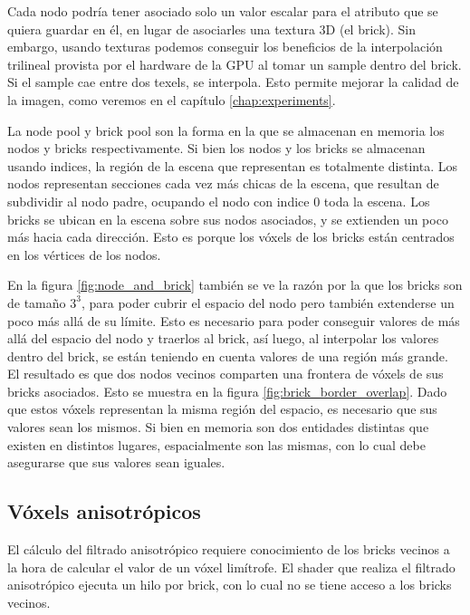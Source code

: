 Cada nodo podría tener asociado solo un valor escalar para el atributo que se quiera guardar en él, en lugar de asociarles una textura 3D (el brick).
Sin embargo, usando texturas podemos conseguir los beneficios de la interpolación trilineal provista por el hardware de la GPU al tomar un sample dentro del brick.
Si el sample cae entre dos texels, se interpola.
Esto permite mejorar la calidad de la imagen, como veremos en el capítulo \ref{chap:experiments}.

La node pool y brick pool son la forma en la que se almacenan en memoria los nodos y bricks respectivamente.
Si bien los nodos y los bricks se almacenan usando indices, la región de la escena que representan es totalmente distinta.
Los nodos representan secciones cada vez más chicas de la escena, que resultan de subdividir al nodo padre, ocupando el nodo con indice $0$ toda la escena.
Los bricks se ubican en la escena sobre sus nodos asociados, y se extienden un poco más hacia cada dirección.
Esto es porque los vóxels de los bricks están centrados en los vértices de los nodos.


En la figura \ref{fig:node_and_brick} también se ve la razón por la que los bricks son de tamaño $3^3$, para poder cubrir el espacio del nodo pero también extenderse un poco más allá de su límite.
Esto es necesario para poder conseguir valores de más allá del espacio del nodo y traerlos al brick, así luego, al interpolar los valores dentro del brick, se están teniendo en cuenta valores de una región más grande.
El resultado es que dos nodos vecinos comparten una frontera de vóxels de sus bricks asociados.
Esto se muestra en la figura \ref{fig:brick_border_overlap}.
Dado que estos vóxels representan la misma región del espacio, es necesario que sus valores sean los mismos.
Si bien en memoria son dos entidades distintas que existen en distintos lugares, espacialmente son las mismas, con lo cual debe asegurarse que sus valores sean iguales.

\subsection{Vóxels anisotrópicos}\label{implementation:anisotropic_vóxels}

El cálculo del filtrado anisotrópico requiere conocimiento de los bricks vecinos a la hora de calcular el valor de un vóxel limítrofe.
El shader que realiza el filtrado anisotrópico ejecuta un hilo por brick, con lo cual no se tiene acceso a los bricks vecinos.

